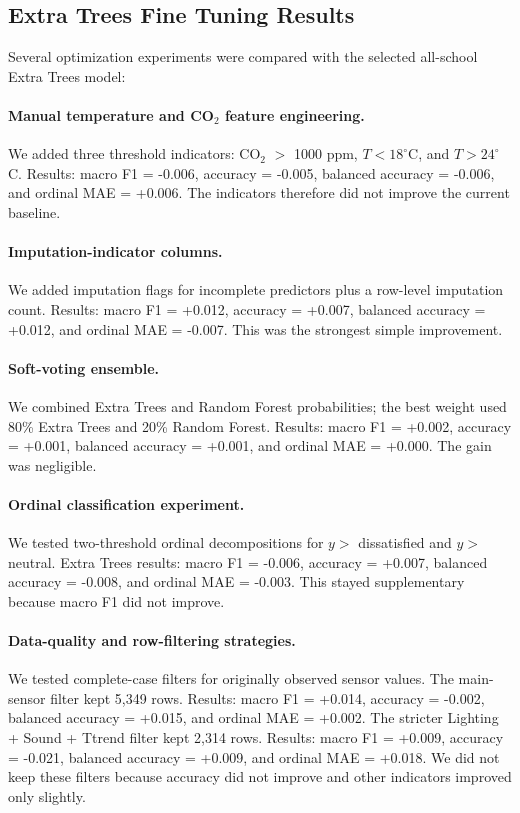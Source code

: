 ﻿\documentclass[11pt]{article}
\newcommand{\Reviewed}[1]{\begingroup\color{black}#1\endgroup}
\begin{document}
\Reviewed{
\subsection{Extra Trees Fine Tuning Results}

Several optimization experiments were compared with the selected all-school Extra Trees model:

\paragraph{Manual temperature and CO$_2$ feature engineering.} We added three threshold indicators: CO$_2$ $>$ 1000 ppm, $T < 18^\circ$C, and $T > 24^\circ$C. Results: macro F1 = -0.006, accuracy = -0.005, balanced accuracy = -0.006, and ordinal MAE = +0.006. The indicators therefore did not improve the current baseline.

\paragraph{Imputation-indicator columns.} We added imputation flags for incomplete predictors plus a row-level imputation count. Results: macro F1 = +0.012, accuracy = +0.007, balanced accuracy = +0.012, and ordinal MAE = -0.007. This was the strongest simple improvement.

\paragraph{Soft-voting ensemble.} We combined Extra Trees and Random Forest probabilities; the best weight used 80\% Extra Trees and 20\% Random Forest. Results: macro F1 = +0.002, accuracy = +0.001, balanced accuracy = +0.001, and ordinal MAE = +0.000. The gain was negligible.

\paragraph{Ordinal classification experiment.} We tested two-threshold ordinal decompositions for $y >$ dissatisfied and $y >$ neutral. Extra Trees results: macro F1 = -0.006, accuracy = +0.007, balanced accuracy = -0.008, and ordinal MAE = -0.003. This stayed supplementary because macro F1 did not improve.

\paragraph{Data-quality and row-filtering strategies.} We tested complete-case filters for originally observed sensor values. The main-sensor filter kept 5{,}349 rows. Results: macro F1 = +0.014, accuracy = -0.002, balanced accuracy = +0.015, and ordinal MAE = +0.002. The stricter Lighting + Sound + Ttrend filter kept 2{,}314 rows. Results: macro F1 = +0.009, accuracy = -0.021, balanced accuracy = +0.009, and ordinal MAE = +0.018. We did not keep these filters because accuracy did not improve and other indicators improved only slightly.


}
\end{document}

